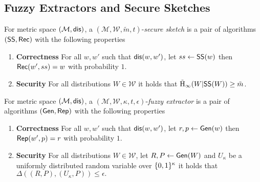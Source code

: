 \subsection{Fuzzy Extractors and Secure Sketches}
\begin{definition}
For metric space $(\mathcal{M}, \mathsf{dis})$, a $(\mathcal{M}, \mathcal{W}, \tilde{m}, t)$-\emph{secure sketch} is a pair of algorithms $({\mathsf{SS}}, {\mathsf{Rec}})$ with the following properties 
\begin{enumerate} 
\itemsep0em
\item \textbf{Correctness} For all $w, w'$ such that $\mathsf{dis}(w, w')$, let $ss \leftarrow {\ensuremath{\mathsf{SS}}}(w)$ then ${\mathsf{Rec}}(w', ss) = w$ with probability $1$. 
\item \textbf{Security} For all distributions $W \in \mathcal{W}$ it holds that $\tilde{\mathrm{H}}_\infty(W | {\mathsf{SS}}(W)) \ge \tilde{m}$.
\end{enumerate}
\end{definition}

\begin{definition}
For metric space $(\mathcal{M}, \mathsf{dis})$, a $(\mathcal{M}, \mathcal{W}, \kappa, t, \epsilon)$-\emph{fuzzy extractor} is a pair of algorithms $({\mathsf{Gen}}, {\mathsf{Rep}})$ with the following properties 
\begin{enumerate} 
\itemsep0em
\item \textbf{Correctness} For all $w, w'$ such that $\mathsf{dis}(w, w')$, let $r, p \leftarrow {\ensuremath{\mathsf{Gen}}}(w)$ then ${\mathsf{Rep}}(w', p) = r$ with probability $1$. 
\item \textbf{Security} For all distributions $W \in \mathcal{W}$, let $R, P \leftarrow {\ensuremath{\mathsf{Gen}}}(W)$ and $U_\kappa$ be a uniformly distributed random variable over $\{0, 1\}^\kappa$ it holds that $\Delta((R, P), (U_\kappa, P))\le \epsilon.$
\end{enumerate}
\end{definition}

